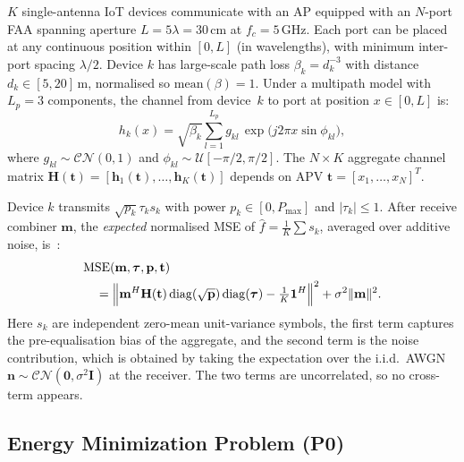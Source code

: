 \documentclass[journal,letterpaper,10pt,twocolumn]{IEEEtran}
\begin{document}
$K$ single-antenna IoT devices communicate with an AP equipped with an
$N$-port FAA spanning aperture $L\!=\!5\lambda\!=\!30$\,cm at
$f_{c}\!=\!5$\,GHz. Each port can be placed at any continuous position
within $[0,L]$ (in wavelengths), with minimum inter-port spacing
$\lambda/2$. Device $k$ has large-scale path loss $\beta_{k}\!=\!d_{k}^{-3}$
with distance $d_{k}\!\in\![5,20]$\,m, normalised so
$\text{mean}(\beta)\!=\!1$. Under a multipath model with $L_{p}\!=\!3$
components, the channel from device~$k$ to port at position
$x\!\in\![0,L]$ is:
\begin{equation}
  h_{k}(x) = \sqrt{\beta_{k}}\sum_{l=1}^{L_{p}}
  g_{kl}\,\exp\!\bigl(j2\pi x\sin\phi_{kl}\bigr),
  \label{eq:channel}
\end{equation}
where $g_{kl}\!\sim\!\mathcal{CN}(0,1)$ and
$\phi_{kl}\!\sim\!\mathcal{U}[-\pi/2,\pi/2]$. The $N\!\times\!K$
aggregate channel matrix $\mathbf{H}(\mathbf{t})\!=\!
[\mathbf{h}_{1}(\mathbf{t}),\ldots,\mathbf{h}_{K}(\mathbf{t})]$ depends
on APV $\mathbf{t}\!=\![x_{1},\ldots,x_{N}]^{T}$.

Device $k$ transmits $\sqrt{p_{k}}\tau_{k}s_{k}$ with power
$p_{k}\!\in\![0,P_{\max}]$ and $|\tau_{k}|\!\leq\!1$. After receive
combiner $\mathbf{m}$, the \textit{expected} normalised MSE of
$\hat{f}\!=\!\frac{1}{K}\sum s_{k}$, averaged over additive noise,
is~\cite{Zhang2024}:
\begin{align}
  &\text{MSE}(\mathbf{m},\boldsymbol{\tau},\mathbf{p},\mathbf{t}) \nonumber\\
  &\quad=\Bigl\|\mathbf{m}^{H}\mathbf{H}(\mathbf{t})
        \operatorname{diag}(\sqrt{\mathbf{p}})\operatorname{diag}(\boldsymbol{\tau})
        -\tfrac{1}{K}\mathbf{1}^{H}\Bigr\|^{2}
        +\sigma^{2}\|\mathbf{m}\|^{2}.
  \label{eq:mse}
\end{align}
Here $s_{k}$ are independent zero-mean unit-variance symbols, the first
term captures the pre-equalisation bias of the aggregate, and the second
term is the noise contribution, which is obtained by taking the
expectation over the i.i.d.\ AWGN $\mathbf{n}\!\sim\!\mathcal{CN}(\mathbf{0},\sigma^{2}\mathbf{I})$
at the receiver. The two terms are uncorrelated, so no cross-term
appears.

\subsection{Energy Minimization Problem (P0)}
\end{document}
